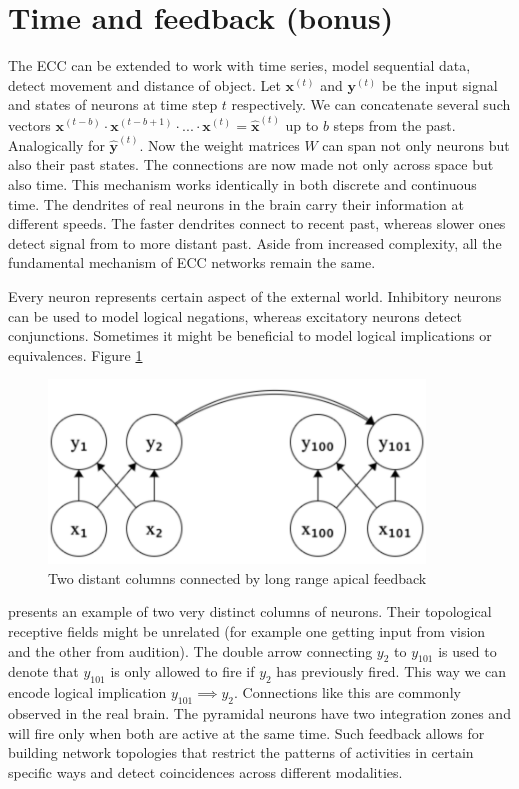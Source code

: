 \documentclass[12pt]{article}
\begin{document}
\section{Time and feedback (bonus)}

The ECC can be extended to work with time series, model sequential data, detect movement and distance of object. Let $\boldsymbol{x}^{(t)}$ and $\boldsymbol{y}^{(t)}$ be the input signal and states of neurons at time step $t$ respectively. We can concatenate several such vectors $\boldsymbol{x}^{(t-b)}\cdot \boldsymbol{x}^{(t-b+1) }\cdot ...\cdot\boldsymbol{x}^{(t)}=\boldsymbol{\hat{x}}^{(t)}$ up to $b$ steps from the past. Analogically for $\boldsymbol{\hat{y}}^{(t)}$. Now the weight matrices $W$ can span not only neurons but also their past states. The connections are now made not only across space but also time. This mechanism works identically in both discrete and continuous time. The dendrites of real neurons in the brain carry their information at different speeds. The faster dendrites connect to recent past, whereas slower ones detect signal from to more distant past. Aside from increased complexity, all the fundamental mechanism of ECC networks remain the same.

Every neuron represents certain aspect of the external world. Inhibitory neurons can be used to model logical negations, whereas excitatory neurons detect conjunctions. Sometimes it might be beneficial to model logical implications or equivalences. Figure \ref{fig:implication} 
\begin{figure}[!htbp]
	\centering
	\includegraphics[width=10cm]{implication}
	\caption{Two distant columns connected by long range apical feedback}
	\label{fig:implication}
\end{figure} 
presents an example of two very distinct columns of neurons. Their topological receptive fields might be unrelated (for example one getting input from vision and the other from audition). The double arrow connecting $y_2$ to $y_{101}$ is used to denote that $y_{101}$ is only allowed to fire if  $y_2$ has previously fired. This way we can encode logical implication $y_{101} \implies y_{2}$. Connections like this are commonly observed in the real brain. The pyramidal neurons have two integration zones and will fire only when both are active at the same time. Such feedback allows for building network topologies that restrict the patterns of activities in certain specific ways and detect coincidences across different modalities.
\end{document}
